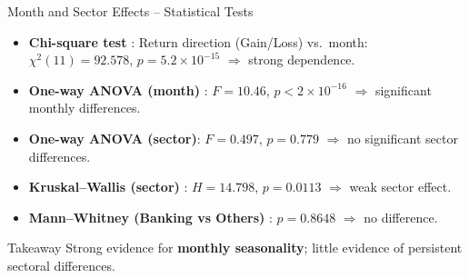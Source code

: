 \documentclass[10pt, aspectratio=169]{beamer}
\begin{document}
\begin{frame}{Month and Sector Effects -- Statistical Tests}
\begin{itemize}
    \item \textbf{Chi-square test} \cite{pearson1900chi}: Return direction (Gain/Loss) vs.\ month: $\chi^2(11)=92.578$, $p=5.2\times10^{-15}$ $\Rightarrow$ strong dependence.
    \item \textbf{One-way ANOVA (month)} \cite{fisher1925statistical}: $F=10.46$, $p<2\times10^{-16}$ $\Rightarrow$ significant monthly differences.
    \item \textbf{One-way ANOVA (sector)}: $F=0.497$, $p=0.779$ $\Rightarrow$ no significant sector differences.
    \item \textbf{Kruskal--Wallis (sector)} \cite{kruskal1952use}: $H=14.798$, $p=0.0113$ $\Rightarrow$ weak sector effect.
    \item \textbf{Mann--Whitney (Banking vs Others)} \cite{mann1947test}: $p=0.8648$ $\Rightarrow$ no difference.
\end{itemize}
\vspace{0.2cm}
\begin{block}{Takeaway}
Strong evidence for \textbf{monthly seasonality}; little evidence of persistent sectoral differences.
\end{block}
\end{frame}
\end{document}

